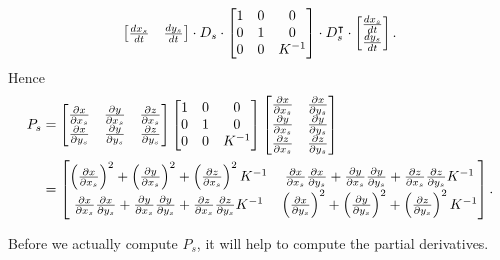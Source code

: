 \documentclass{ximera}
\begin{document}
\begin{problem}
\begin{freeResponse}
\begin{align*}
\begin{bmatrix}
      \frac{dx_s}{dt} & \frac{dy_s}{dt}
    \end{bmatrix}\cdot D_{s}\cdot
    \begin{bmatrix}
      1 & 0 & 0\\
      0 & 1 & 0\\
    0 & 0 & K^{-1}
    \end{bmatrix}
    \cdot
    D_{s}^\transpose
    \cdot \begin{bmatrix}
      \frac{dx_s}{dt} \\ \frac{dy_s}{dt}
    \end{bmatrix}.
  \end{align*}
    Hence
    \begin{align*}
      P_s &=
      \begin{bmatrix}
        \pp[x]{x_s} & \pp[y]{x_s} & \pp[z]{x_s} \\
        \pp[x]{y_s} & \pp[y]{y_s} & \pp[z]{y_s}
      \end{bmatrix}
      \begin{bmatrix}
        1 & 0 & 0\\
        0 & 1 & 0\\
        0 & 0 & K^{-1}
      \end{bmatrix}
      \begin{bmatrix}
        \pp[x]{x_s} & \pp[x]{y_s}\\ 
        \pp[y]{x_s} & \pp[y]{y_s}\\
        \pp[z]{x_s} & \pp[z]{y_s}
      \end{bmatrix}\\
      &=
      \begin{bmatrix}
        \left(\pp[x]{x_s}\right)^2 + \left(\pp[y]{x_s}\right)^2 + \left(\pp[z]{x_s}\right)^2K^{-1} & \pp[x]{x_s}\pp[x]{y_s} + \pp[y]{x_s}\pp[y]{y_s} + \pp[z]{x_s}\pp[z]{y_s} K^{-1}\\
        \pp[x]{x_s}\pp[x]{y_s} + \pp[y]{x_s}\pp[y]{y_s} + \pp[z]{x_s}\pp[z]{y_s} K^{-1}       & \left(\pp[x]{y_s}\right)^2 + \left(\pp[y]{y_s}\right)^2 + \left(\pp[z]{y_s}\right)^2K^{-1}
      \end{bmatrix}.
    \end{align*}
  \end{freeResponse}
\end{problem}


Before we actually compute $P_s$, it will help to compute the partial
derivatives.
\end{document}
